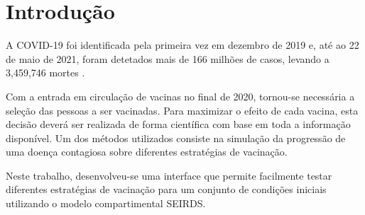 \section{Introdução}
A COVID-19 foi identificada pela primeira vez em dezembro de 2019 e, até ao 22 de maio de 2021, foram detetados mais de 166 milhões de casos, levando a 3,459,746 mortes \cite{...}.

Com a entrada em circulação de vacinas no final de 2020, tornou-se necessária a seleção das pessoas a ser vacinadas.
Para maximizar o efeito de cada vacina, esta decisão deverá ser realizada de forma científica com base em toda a informação disponível.
Um dos métodos utilizados consiste na simulação da progressão de uma doença contagiosa sobre diferentes estratégias de vacinação.

Neste trabalho, desenvolveu-se uma interface que permite facilmente testar diferentes estratégias de vacinação para um conjunto de condições iniciais utilizando o modelo compartimental SEIRDS.

